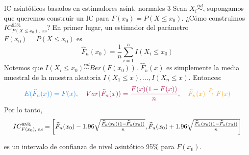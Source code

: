 \documentclass{beamer}
\theoremstyle{definition}
\newcommand{\cp}{\overset{P}{\rightarrow}}
\begin{document}
\begin{frame}{\color{rosee}IC asint\'oticos basados en estimadores asint. normales 3}\small
Sean $X_i\stackrel{iid}{\sim}$, supongamos que queremos construir un IC para $F(x_{0})=P(X\leq x_{0})$. ¿Cómo construimos $IC_{P(X\leq x_0),\text{ as}}^{95\%}$? En primer lugar, un estimador del parámetro $F(x_0)=P(X\leq x_0)$ es \[\widehat{F}_n(x_0) = \frac{1}{n} \sum_{i=1}^n I(X_i \leq x_0)\]
 Notemos que $I(X_{i}\leq x_0)\stackrel{iid}{\sim} Ber(F(x_{0}))$. $\widehat{F}_n(x)$ es simplemente la media muestral de la muestra aleatoria $I(X_1 \leq x),\dots,I(X_n \leq x)$. Entonces:  \[ \color{dodgerblue}E(\widehat{F}_n(x)) = F(x), \quad \color{rosee}Var(\widehat{F}_n(x)) = \frac{F(x)(1-F(x))}{n}, \quad \color{orang}\widehat{F}_n(x) \cp F(x)\]   
Por lo tanto, \[\scalebox{0.95}{$
IC_{F(x_0),\text{ as}}^{95\%}=\left[\widehat{F}_{n}(x_0) -1.96\sqrt{\frac{\widehat{F}_{n}(x_0)(1-\widehat{F}_{n}(x_0))}{n}},\widehat{F}_{n}(x_0) + 1.96\sqrt{\frac{\widehat{F}_{n}(x_0)(1-\widehat{F}_{n}(x_0))}{n}}\right]
$}\]

es un intervalo de confianza de nivel asintótico 95\% para $F(x_0)$.

\end{frame}
\end{document}
